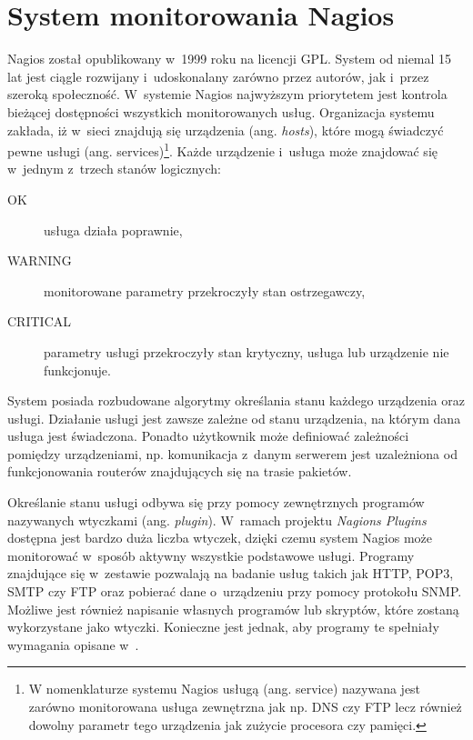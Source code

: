 \section[Nagios][System monitorowania Nagios]{System monitorowania Nagios}
\label{sec:Nagios}

Nagios\cite{www:Nagios} został opublikowany w~1999 roku na licencji GPL. System od
niemal 15 lat jest ciągle rozwijany i~udoskonalany zarówno przez
autorów, jak i~przez szeroką społeczność. W~systemie Nagios najwyższym
priorytetem jest kontrola bieżącej dostępności wszystkich
monitorowanych usług. Organizacja systemu zakłada, iż w~sieci znajdują
się urządzenia (ang. {\em hosts}), które mogą świadczyć pewne usługi
(ang. services)\footnote{W nomenklaturze systemu Nagios usługą
  (ang. service) nazywana jest zarówno monitorowana usługa zewnętrzna
  jak np. DNS czy FTP lecz również dowolny parametr tego urządzenia
  jak zużycie procesora czy pamięci.}. Każde urządzenie i~usługa może
  znajdować się w~jednym z~trzech stanów logicznych:

\begin{description}
\item[OK] usługa działa poprawnie,
\item[WARNING] monitorowane parametry przekroczyły stan ostrzegawczy,
\item[CRITICAL] parametry usługi przekroczyły stan krytyczny, usługa
  lub urządzenie nie funkcjonuje.
\end{description}

System posiada rozbudowane algorytmy określania stanu każdego
urządzenia oraz usługi. Działanie usługi jest zawsze zależne od stanu
urządzenia, na którym dana usługa jest świadczona. Ponadto użytkownik
może definiować zależności pomiędzy urządzeniami, np. komunikacja
z~danym serwerem jest uzależniona od funkcjonowania routerów
znajdujących się na trasie pakietów.

Określanie stanu usługi odbywa się przy pomocy zewnętrznych programów
nazywanych wtyczkami (ang. {\em plugin}). W~ramach projektu {\em
  Nagions Plugins}\cite{www:NagiosPluginProject} dostępna jest bardzo
duża liczba wtyczek, dzięki czemu system Nagios może monitorować
w~sposób aktywny wszystkie podstawowe usługi. Programy znajdujące się
w~zestawie pozwalają na badanie usług takich jak HTTP, POP3, SMTP czy
FTP oraz pobierać dane o~urządzeniu przy pomocy protokołu
SNMP. Możliwe jest również napisanie własnych programów lub skryptów,
które zostaną wykorzystane jako wtyczki. Konieczne jest jednak, aby
programy te spełniały wymagania opisane
w~\cite{www:NagiosPluginsTutorial}.


